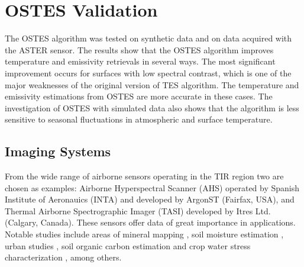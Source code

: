 \chapter{OSTES Validation}
\label{chap:OSTESValid}

The OSTES algorithm was tested on synthetic data and on data acquired with the ASTER sensor. The results show that the OSTES algorithm improves temperature and emissivity retrievals in several ways. The most significant improvement occurs for surfaces with low spectral contrast, which is one of the major weaknesses of the original version of TES algorithm. The temperature and emissivity estimations from OSTES are more accurate in these cases. The investigation of OSTES with simulated data also shows that the algorithm is less sensitive to seasonal fluctuations in atmospheric and surface temperature.

\section{Imaging Systems}

From the wide range of airborne sensors operating in the TIR region two are chosen as examples: Airborne Hyperspectral Scanner (AHS) operated by Spanish Institute of Aeronauics (INTA) and developed by ArgonST (Fairfax, USA), and Thermal Airborne Spectrographic Imager (TASI) developed by Itres Ltd. (Calgary, Canada). These sensors offer data of great importance in applications. Notable studies include areas of
mineral mapping \cite{NK14}, 
soil moisture estimation \cite{SF12}, 
urban studies \cite{SO12},
soil organic carbon estimation \cite{PC14} and
crop water stress characterization \cite{PP12},
among others.

